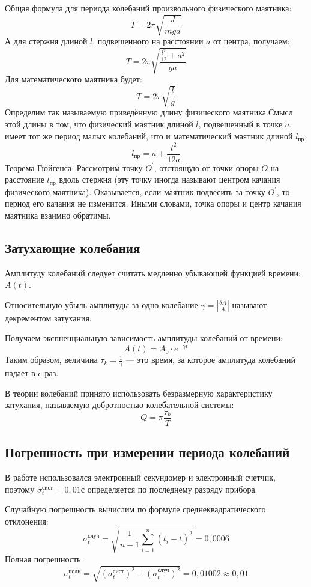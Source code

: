 \documentclass[a4paper]{article}
\begin{document}
Общая формула для периода колебаний произвольного физического маятника:
\[T = 2\pi \sqrt{\frac{J}{mga}}\]
А для стержня длиной $l$, подвешенного на расстоянии $a$ от центра, получаем:
\[T = 2\pi \sqrt{\frac{\frac{l^2}{12}+a^2}{ga}}\]
Для математического маятника будет:
\[T = 2\pi \sqrt{\frac{l}{g}}\]
Определим так называемую приведённую длину физического маятника.Смысл этой длины в том, что физический маятник длиной $l$, подвешенный в точке $a$, имеет тот же период малых колебаний, что и математический маятник длиной $l_{\text{пр}}$:
\[l_{\text{пр}} = a + \frac{l^2}{12a}\]
\underline{Теорема Гюйгенса}: Рассмотрим точку $O^{'}$, отстоящую от точки опоры $O$ на расстояние $l_{\text{пр}}$ вдоль стержня (эту точку иногда
называют центром качания физического маятника). Оказывается, если маятник подвесить за точку $O^{'}$, то период его качания не изменится. Иными словами, точка опоры и центр качания маятника взаимно обратимы.

\subsection{Затухающие колебания}
Амплитуду колебаний следует считать медленно убывающей функцией времени: $A(t)$.

Относительную убыль амплитуды за одно колебание $\gamma = |\frac{\delta A}{A}|$ называют декрементом затухания.

Получаем экспненциальную зависимость амплитуды колебаний от времени:
\[A(t) = A_{0} \cdot e^{-\gamma t}\]
Таким образом, величина $\tau_{k} = \frac{1}{\gamma}$ — это время, за которое амплитуда колебаний падает в $e$ раз.

В теории колебаний принято использовать безразмерную характеристику затухания, называемую добротностью колебательной системы:
\[Q = \pi\frac{\tau_{k}}{T}\]

\subsection{Погрешность при измерении периода колебаний}
В работе использовался электронный секундомер и электронный счетчик, поэтому $\sigma_{t}^{\text{сист}} = 0,01$с определяется по последнему разряду прибора.

Случайную погрешность вычислим по формуле среднеквадратического отклонения:
\[\sigma_{t}^{\text{случ}} = \sqrt{\frac{1}{n-1}\sum\limits_{i=1}^{n} (t_{i} - \overline{t})^2} = 0,0006\]
Полная погрешность:
\[\sigma_{t}^{\text{полн}} = \sqrt{(\sigma_{t}^{\text{сист}})^2 + (\sigma_{t}^{\text{случ}})^2} = 0,01002 \approx 0,01\]
\end{document}
